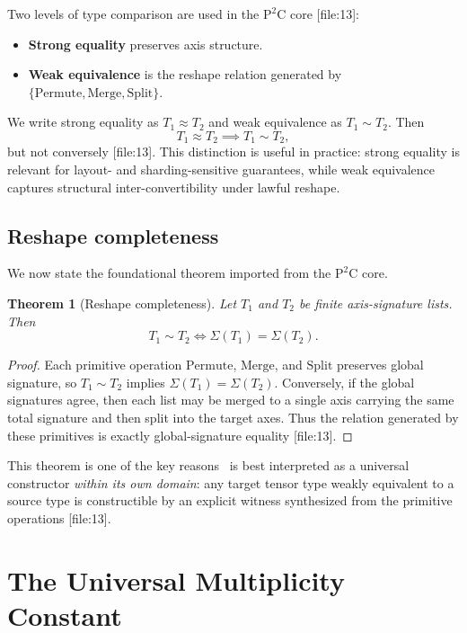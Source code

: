 \documentclass[11pt,a4paper]{article}
\newtheorem{theorem}{Theorem}[section]
\newcommand{\globalSig}{\Sigma}
\newcommand{\weak}{\sim}
\newcommand{\strong}{\approx}
\newcommand{\PETC}{\mathrm{PETC}}
\begin{document}
Two levels of type comparison are used in the \(\mathrm{P}^2\mathrm{C}\) core [file:13]:

\begin{itemize}[leftmargin=2em]
\item \textbf{Strong equality} preserves axis structure.
\item \textbf{Weak equivalence} is the reshape relation generated by \(\{\mathrm{Permute},\mathrm{Merge},\mathrm{Split}\}\).
\end{itemize}

We write strong equality as \(T_1 \strong T_2\) and weak equivalence as \(T_1 \weak T_2\). Then
\[
T_1 \strong T_2 \implies T_1 \weak T_2,
\]
but not conversely [file:13]. This distinction is useful in practice: strong equality is relevant for layout- and sharding-sensitive guarantees, while weak equivalence captures structural inter-convertibility under lawful reshape.

\subsection{Reshape completeness}

We now state the foundational theorem imported from the \(\mathrm{P}^2\mathrm{C}\) core.

\begin{theorem}[Reshape completeness]
Let \(T_1\) and \(T_2\) be finite axis-signature lists. Then
\[
T_1 \weak T_2 \iff \globalSig(T_1) = \globalSig(T_2).
\]
\end{theorem}

\begin{proof}
Each primitive operation \(\mathrm{Permute}\), \(\mathrm{Merge}\), and \(\mathrm{Split}\) preserves global signature, so \(T_1 \weak T_2\) implies \(\globalSig(T_1)=\globalSig(T_2)\). Conversely, if the global signatures agree, then each list may be merged to a single axis carrying the same total signature and then split into the target axes. Thus the relation generated by these primitives is exactly global-signature equality [file:13].
\end{proof}

This theorem is one of the key reasons \PETC\ is best interpreted as a universal constructor \emph{within its own domain}: any target tensor type weakly equivalent to a source type is constructible by an explicit witness synthesized from the primitive operations [file:13].

\section{The Universal Multiplicity Constant}
\end{document}
